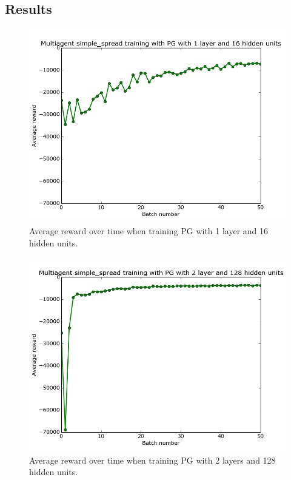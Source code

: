 \documentclass{article}
\begin{document}
\subsection{Results}

\begin{figure}
\begin{center}
    \includegraphics[scale=0.25]{pg-1-16-gamma1}
    \caption{Average reward over time when training PG with 1 layer and 16 hidden units.}
\end{center}
\label{fig:pg-1-16}
\end{figure}

\begin{figure}
\begin{center}
    \includegraphics[scale=0.25]{pg-2-128-gamma1}
    \caption{Average reward over time when training PG with 2 layers and 128 hidden units.}
\end{center}
\label{fig:pg-2-128}
\end{figure}
\end{document}
